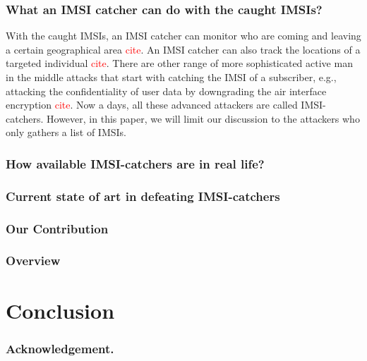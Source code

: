 \documentclass{llncs} %
\begin{document}
\subsubsection{What an IMSI catcher can do with the caught IMSIs?} With the caught IMSIs, an IMSI catcher can monitor who are coming and leaving a certain geographical area \textcolor{red}{cite}. An IMSI catcher can also track the locations of a targeted individual \textcolor{red}{cite}. There are other range of more sophisticated active man in the middle attacks that start with catching the IMSI of a subscriber, e.g., attacking the confidentiality of user data by downgrading the air interface encryption \textcolor{red}{cite}. Now a days, all these advanced attackers are called IMSI-catchers. However, in this paper, we will limit our discussion to the attackers who only gathers a list of IMSIs.

\subsubsection{How available IMSI-catchers are in real life?}

\subsubsection{Current state of art in defeating IMSI-catchers}

\subsubsection{Our Contribution}

\subsubsection{Overview}



\section{Conclusion}
\label{sec:conclusion}


\subsubsection{Acknowledgement.}
\label{sec:acknowledgement}


%

\begin{thebibliography}{5}



\end{thebibliography}
\end{document}
